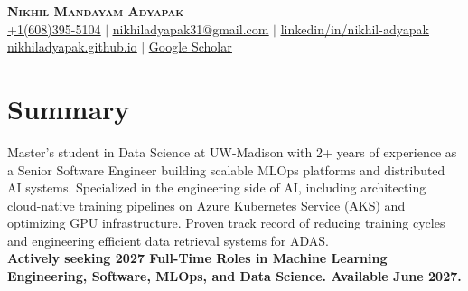 \documentclass[letterpaper,11pt]{article}
\begin{document}

\newcommand{\makeboxlabel}[1]{\fbox{#1.}\hfill}%
\newenvironment{boxlabel}
  {\begin{list}
    {\arabic{boxlblcounter}}
    {\usecounter{boxlblcounter}
     \setlength{\labelwidth}{3em}
     \setlength{\labelsep}{0em}
     \setlength{\itemsep}{2pt}
     \setlength{\leftmargin}{1.5cm}
     \setlength{\rightmargin}{2cm}
     \setlength{\itemindent}{0em} 
     \let\makelabel=\makeboxlabel
    }
  }
{\end{list}}


\begin{center}
    \textbf{\Huge \scshape Nikhil Mandayam Adyapak} \\ \vspace{2.5pt}
    \small \href{https://wa.me/917349304990?text=Hello!+I'm+<your+name>%2C+and+I've+found+you+via+your+resume.+I+am+reaching+out+because+<...>}{\underline{+1(608)395-5104}} $|$ \href{mailto:nikhiladyapak31@gmail.com}{\underline{nikhiladyapak31@gmail.com}} $|$ 
    \href{https://www.linkedin.com/in/nikhil-adyapak/}{\underline{linkedin/in/nikhil-adyapak}} $|$
    \href{https://nikhiladyapak.github.io/}{\underline{nikhiladyapak.github.io}} $|$
    \href{https://scholar.google.com/citations?hl=en&user=VAOBlIMAAAAJ}{\underline{Google Scholar}}
\end{center}

\section{Summary}
  \small{
  Master’s student in Data Science at UW-Madison with 2+ years of experience as a Senior Software Engineer building scalable MLOps platforms and distributed AI systems. Specialized in the engineering side of AI, including architecting cloud-native training pipelines on Azure Kubernetes Service (AKS) and optimizing GPU infrastructure. Proven track record of reducing training cycles and engineering efficient data retrieval systems for ADAS. \\ \textbf{Actively seeking 2027 Full-Time Roles in Machine Learning Engineering, Software, MLOps, and Data Science. Available June 2027.}
  }
\end{document}
